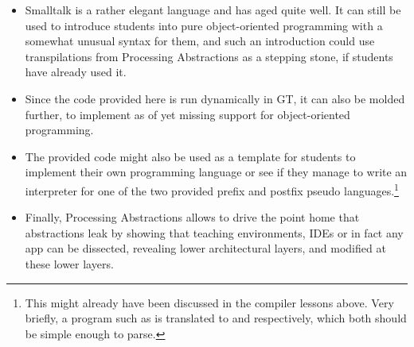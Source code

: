 \begin{itemize}
\item Smalltalk is a rather elegant language and has aged quite well. It can still be used to introduce students into pure object-oriented programming with a somewhat unusual syntax for them, and such an introduction could use transpilations from Processing Abstractions as a stepping stone, if students have already used it.
\item Since the code provided here is run dynamically in \ac{GT}, it can also be molded further, \eg to implement as of yet missing support for object-oriented programming.
\item The provided code might also be used as a template for students to implement their own programming language or see if they manage to write an interpreter for one of the two provided prefix and postfix pseudo languages.\footnote{This might already have been discussed in the compiler lessons above. Very briefly, a program such as  is translated to  and  respectively, which both should be simple enough to parse.}
\item Finally, Processing Abstractions allows to drive the point home that abstractions leak by showing that teaching environments, \acp{IDE} or in fact any app can be dissected, revealing lower architectural layers, and modified at these lower layers.
\end{itemize}
